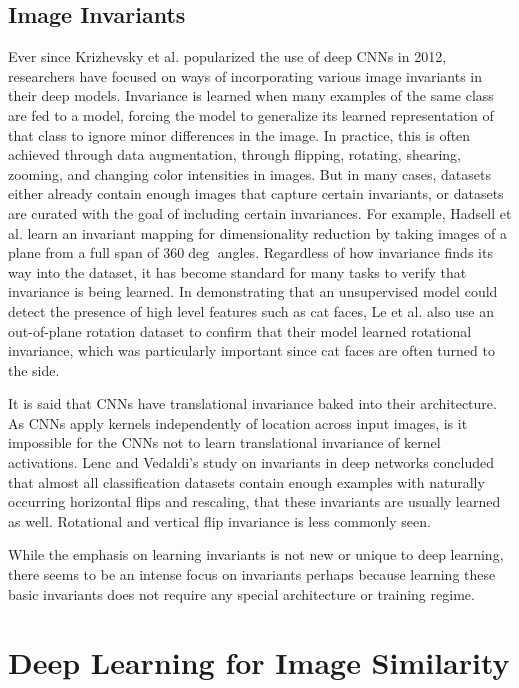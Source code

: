 \subsection{Image Invariants}
Ever since Krizhevsky et al. popularized the use of deep CNNs in 2012, researchers have focused on ways of incorporating various image invariants in their deep models. Invariance is learned when many examples of the same class are fed to a model, forcing the model to generalize its learned representation of that class to ignore minor differences in the image. In practice, this is often achieved through data augmentation, through flipping, rotating, shearing, zooming, and changing color intensities in images. But in many cases, datasets either already contain enough images that capture certain invariants, or datasets are curated with the goal of including certain invariances. For example, Hadsell et al. learn an invariant mapping for dimensionality reduction by taking images of a plane from a full span of 360$\deg$ angles.\cite{hadsell2006dimensionality} Regardless of how invariance finds its way into the dataset, it has become standard for many tasks to verify that invariance is being learned. In demonstrating that an unsupervised model could detect the presence of high level features such as cat faces, Le et al. also use an out-of-plane rotation dataset to confirm that their model learned rotational invariance, which was particularly important since cat faces are often turned to the side.\cite{le2013building}

It is said that CNNs have translational invariance baked into their architecture. As CNNs apply kernels independently of location across input images, is it impossible for the CNNs not to learn translational invariance of kernel activations. Lenc and Vedaldi's study on invariants in deep networks concluded that almost all classification datasets contain enough examples with naturally occurring horizontal flips and rescaling, that these invariants are usually learned as well.\cite{vedaldi2010vlfeat} Rotational and vertical flip invariance is less commonly seen.

While the emphasis on learning invariants is not new or unique to deep learning, there seems to be an intense focus on invariants perhaps because learning these basic invariants does not require any special architecture or training regime.

\section{Deep Learning for Image Similarity}
